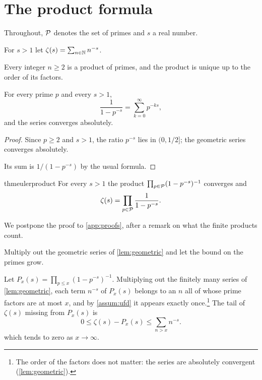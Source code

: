 \section{The product
  formula}\label{sec:product}

Throughout, $\mathcal{P}$ denotes the set of primes and $s$ a real number.

\begin{defn}\label{def:zeta}
For $s > 1$ let $\zeta(s) = \sum_{n \in \mathbb{N}} n^{-s}$.
\end{defn}

\begin{assum}\label{assum:ufd}
Every integer $n \ge 2$ is a product of primes, and the product is unique
up to the order of its factors.
\end{assum}

\begin{lem}\label{lem:geometric}
For every prime $p$ and every $s > 1$,
\[
  \frac{1}{1 - p^{-s}} = \sum_{k=0}^{\infty} p^{-ks},
\]
and the series converges absolutely.
\end{lem}

\begin{proof}
Since $p \ge 2$ and $s > 1$, the ratio $p^{-s}$ lies in $(0, 1/2]$; the
geometric series converges absolutely.

Its sum is $1/(1 - p^{-s})$ by the usual formula.
\end{proof}

\begin{restatable}{thm}{eulerproduct}\label{thm:euler-product}
For every $s > 1$ the product $\prod_{p \in \mathcal{P}} (1 - p^{-s})^{-1}$
converges and
\begin{equation}\label{eq:euler-product}
  \zeta(s) = \prod_{p \in \mathcal{P}} \frac{1}{1 - p^{-s}}.
\end{equation}
\end{restatable}

We postpone the proof to \cref{app:proofs}, after a remark on what the
finite products count.

\begin{proofsketch}
Multiply out the geometric series of \cref{lem:geometric} and let the
bound on the primes grow.
\end{proofsketch}

\begin{rem}
Let $P_x(s) = \prod_{p \le x} (1 - p^{-s})^{-1}$. Multiplying out the
finitely many series of \cref{lem:geometric}, each term $n^{-s}$ of
$P_x(s)$ belongs to an $n$ all of whose prime factors are at most $x$, and
by \cref{assum:ufd} it appears exactly once.\footnote{The order of the
  factors does not matter: the series are absolutely convergent
  (\cref{lem:geometric}).} The tail of $\zeta(s)$ missing from $P_x(s)$ is
\label{eq:tail}
\[
  0 \le \zeta(s) - P_x(s) \le \sum_{n > x} n^{-s}.
\]
which tends to zero as $x \to \infty$.
\end{rem}

